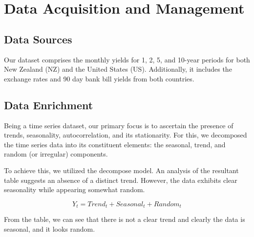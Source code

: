 \documentclass[10pt]{article}
\begin{document}
\section{Data Acquisition and Management}

\subsection{Data Sources}
Our dataset comprises the monthly yields for 1, 2, 5, and 10-year periods for both New Zealand (NZ) and the United States (US). Additionally, it includes the exchange rates and 90 day bank bill yields from both countries.



\subsection{Data Enrichment}

Being a time series dataset, our primary focus is to ascertain the presence of trends, seasonality, autocorrelation, and its stationarity. For this, we decomposed the time series data into its constituent elements: the seasonal, trend, and random (or irregular) components.

To achieve this, we utilized the decompose model. An analysis of the resultant table suggests an absence of a distinct trend. However, the data exhibits clear seasonality while appearing somewhat random.

\[Y_{t}=Trend_{t}+Seasonal_{t}+Random_{t}\]

From the table, we can see that there is not a clear trend and clearly the data is seasonal, and it looks random.
\end{document}
